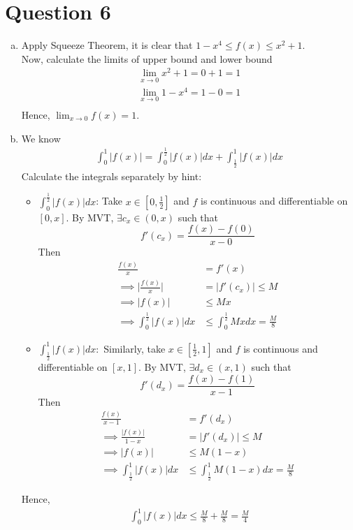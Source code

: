 \documentclass[11pt]{article}
\begin{document}
\section*{Question 6}
\begin{enumerate}[(a)]
    \item Apply Squeeze Theorem, it is clear that $1-x^4 \leq f(x)\leq x^2+1$. \\
    Now, calculate the limits of upper bound and lower bound
    \begin{align*}
        \lim_{x\to 0} x^2+1 = 0+1=1 \\
        \lim_{x\to 0} 1-x^4 = 1-0=1 \\ 
    \end{align*}
    Hence, $\displaystyle \lim_{x\to 0}f(x)=1.$
    \item 
    We know 
    \begin{align*}
        \int_{0}^1 \lvert f(x) \rvert = \int_{0}^\frac{1}{2}\lvert f(x) \rvert dx + \int_{\frac{1}{2}}^1 \lvert f(x) \rvert dx
    \end{align*}
    Calculate the integrals separately by hint:
    \begin{itemize}
        \item 
        $\displaystyle \int_{0}^\frac{1}{2} \lvert f(x) \rvert dx$: Take $x\in [0,\frac{1}{2}]$ and $f$ is continuous and differentiable on $[0,x]$. By MVT, $\exists c_x \in (0,x)$ such that $$f'(c_x)=\frac{f(x)-f(0)}{x-0}$$    
        Then 
        \begin{align*}
            \frac{f(x)}{x}&=f'(x)\\
            \implies \lvert \frac{f(x)}{x}\rvert &= \lvert f'(c_x)\rvert \leq M \\
            \implies \lvert f(x) \rvert &\leq Mx\\
            \implies \int_{0}^{\frac{1}{2}} \lvert f(x) \rvert dx &\leq \int_0^\frac{1}{2}Mx dx= \frac{M}{8}
        \end{align*}
        \item 
        $\displaystyle \int_{\frac{1}{2}}^1\lvert f(x) \rvert dx:$
        Similarly, take $x\in [\frac{1}{2},1]$ and $f$ is continuous and differentiable on $[x,1]$. By MVT, $\exists d_x \in (x,1)$ such that $$f'(d_x)=\frac{f(x)-f(1)}{x-1}$$    
        Then 
        \begin{align*}
            \frac{f(x)}{x-1}&=f'(d_x)\\
            \implies\frac{\lvert f(x)\rvert}{1-x} &= \lvert f'(d_x)\rvert \leq M \\
            \implies \lvert f(x) \rvert &\leq M(1-x)\\
            \implies \int_{\frac{1}{2}}^1 \lvert f(x) \rvert dx &\leq \int_\frac{1}{2}^1M(1-x) dx= \frac{M}{8}
        \end{align*}
    \end{itemize}
    Hence, 
    \begin{align*}
        \int_{0}^1 \lvert f(x) \rvert dx \leq \frac{M}{8} + \frac{M}{8}= \frac{M}{4}
    \end{align*}
\end{enumerate}
\newpage 
\end{document}

